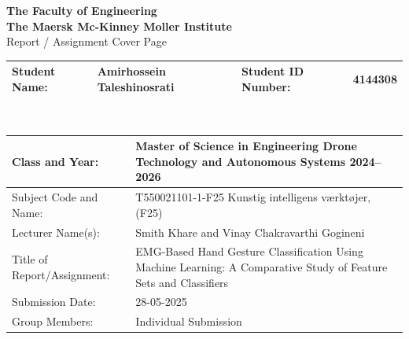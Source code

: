 \begin{titlepage}

    \centering
    \textbf{\Large The Faculty of Engineering} \\[0.3em]
    \textbf{\Large The Maersk Mc-Kinney Moller Institute} \\[0.3em]
    {\Large Report / Assignment Cover Page} \\[0.8cm]

    \begin{tabularx}{\textwidth}{|l X | l X|}
    \hline
    \textbf{Student Name:} & Amirhossein Taleshinosrati &
    \textbf{Student ID Number:} & 4144308 \\
    \hline
    \end{tabularx}\\[0.7cm]

    \begin{tabularx}{\textwidth}{|l|X|}
    \hline
    Class and Year: &
        Master of Science in Engineering Drone Technology and Autonomous Systems 2024--2026 \\
    \hline
    Subject Code and Name: &
        T550021101-1-F25 Kunstig intelligens v\ae{}rkt\o{}jer, (F25) \\
    \hline
    Lecturer Name(s): &
        Smith Khare and Vinay Chakravarthi Gogineni \\
    \hline
    Title of Report/Assignment: &
        EMG-Based Hand Gesture Classification Using Machine Learning:
        A Comparative Study of Feature Sets and Classifiers \\
    \hline
    Submission Date: &
        28-05-2025 \\
    \hline
    Group Members: &
        Individual Submission \\
    \hline
    \end{tabularx}\\[1cm]


\end{titlepage}
